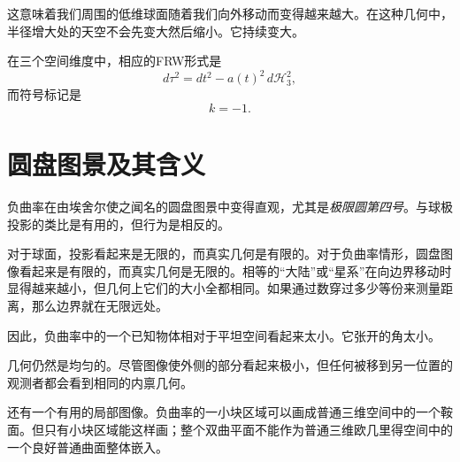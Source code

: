 这意味着我们周围的低维球面随着我们向外移动而变得越来越大。在这种几何中，半径增大处的天空不会先变大然后缩小。它持续变大。

在三个空间维度中，相应的FRW形式是
\begin{equation}
d\tau^2=dt^2-a(t)^2\,d\mathcal H_3^2,
\end{equation}
而符号标记是
\begin{equation}
k=-1.
\end{equation}

\section{圆盘图景及其含义}

负曲率在由埃舍尔使之闻名的圆盘图景中变得直观，尤其是\emph{极限圆第四号}。与球极投影的类比是有用的，但行为是相反的。

对于球面，投影看起来是无限的，而真实几何是有限的。对于负曲率情形，圆盘图像看起来是有限的，而真实几何是无限的。相等的``大陆''或``星系''在向边界移动时显得越来越小，但几何上它们的大小全都相同。如果通过数穿过多少等份来测量距离，那么边界就在无限远处。

因此，负曲率中的一个已知物体相对于平坦空间看起来太小。它张开的角太小。

几何仍然是均匀的。尽管图像使外侧的部分看起来极小，但任何被移到另一位置的观测者都会看到相同的内禀几何。

\begin{classroomqa}
\end{classroomqa}

\begin{classroomqa}
\end{classroomqa}

\begin{classroomqa}
\end{classroomqa}

还有一个有用的局部图像。负曲率的一小块区域可以画成普通三维空间中的一个鞍面。但只有小块区域能这样画；整个双曲平面不能作为普通三维欧几里得空间中的一个良好普通曲面整体嵌入。

